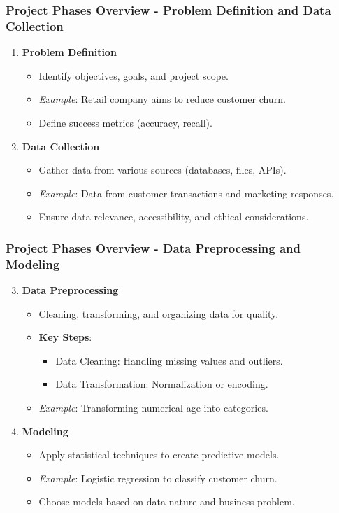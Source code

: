 \documentclass[aspectratio=169]{beamer}
\begin{document}
\begin{frame}[fragile]
    \frametitle{Project Phases Overview - Problem Definition and Data Collection}
    \begin{enumerate}
        \item \textbf{Problem Definition}
        \begin{itemize}
            \item Identify objectives, goals, and project scope.
            \item \textit{Example}: Retail company aims to reduce customer churn.
            \item Define success metrics (accuracy, recall).
        \end{itemize}

        \item \textbf{Data Collection}
        \begin{itemize}
            \item Gather data from various sources (databases, files, APIs).
            \item \textit{Example}: Data from customer transactions and marketing responses.
            \item Ensure data relevance, accessibility, and ethical considerations.
        \end{itemize}
    \end{enumerate}
\end{frame}

\begin{frame}[fragile]
    \frametitle{Project Phases Overview - Data Preprocessing and Modeling}
    \begin{enumerate}
        \setcounter{enumi}{2}
        \item \textbf{Data Preprocessing}
        \begin{itemize}
            \item Cleaning, transforming, and organizing data for quality.
            \item \textbf{Key Steps}:
            \begin{itemize}
                \item Data Cleaning: Handling missing values and outliers.
                \item Data Transformation: Normalization or encoding.
            \end{itemize}
            \item \textit{Example}: Transforming numerical age into categories.
        \end{itemize}

        \item \textbf{Modeling}
        \begin{itemize}
            \item Apply statistical techniques to create predictive models.
            \item \textit{Example}: Logistic regression to classify customer churn.
            \item Choose models based on data nature and business problem.
        \end{itemize}
    \end{enumerate}
\end{frame}
\end{document}
